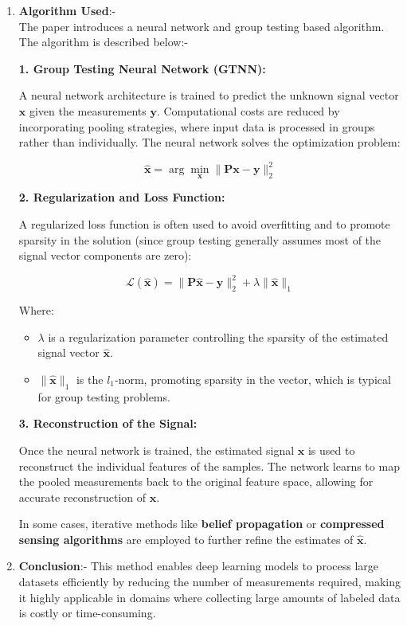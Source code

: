 \documentclass{article}
\begin{document}
\begin{enumerate}
\begin{enumerate}
        \item \textbf{Algorithm Used}:-\\
        The paper introduces a neural network and group testing based algorithm. The algorithm is described below:-

        \textbf{1. Group Testing Neural Network (GTNN):}
        
        A neural network architecture is trained to predict the unknown signal vector \( \mathbf{x} \) given the measurements \( \mathbf{y} \). Computational costs are reduced by incorporating pooling strategies, where input data is processed in groups rather than individually. The neural network solves the optimization problem:
        
        \[
        \hat{\mathbf{x}} = \arg \min_{\mathbf{x}} \| \mathbf{P} \mathbf{x} - \mathbf{y} \|_2^2
        \]
                
        \textbf{2. Regularization and Loss Function:}
        
        A regularized loss function is often used to avoid overfitting and to promote sparsity in the solution (since group testing generally assumes most of the signal vector components are zero):
        
        \[
        \mathcal{L}(\hat{\mathbf{x}}) = \| \mathbf{P} \hat{\mathbf{x}} - \mathbf{y} \|_2^2 + \lambda \|\hat{\mathbf{x}}\|_1
        \]
        
        Where:
        \begin{itemize}
            \item \( \lambda \) is a regularization parameter controlling the sparsity of the estimated signal vector \( \hat{\mathbf{x}} \).
            \item \( \|\hat{\mathbf{x}}\|_1 \) is the \( l_1 \)-norm, promoting sparsity in the vector, which is typical for group testing problems.
        \end{itemize}
        
        \textbf{3. Reconstruction of the Signal:}
        
        Once the neural network is trained, the estimated signal \( \hat{\mathbf{x}} \) is used to reconstruct the individual features of the samples. The network learns to map the pooled measurements back to the original feature space, allowing for accurate reconstruction of \( \mathbf{x} \).
        
        In some cases, iterative methods like \textbf{belief propagation} or \textbf{compressed sensing algorithms} are employed to further refine the estimates of \( \hat{\mathbf{x}} \).

        \item \textbf{Conclusion}:- This method enables deep learning models to process large datasets efficiently by reducing the number of measurements required, making it highly applicable in domains where collecting large amounts of labeled data is costly or time-consuming.
    \end{enumerate}

\end{enumerate}
\end{document}
